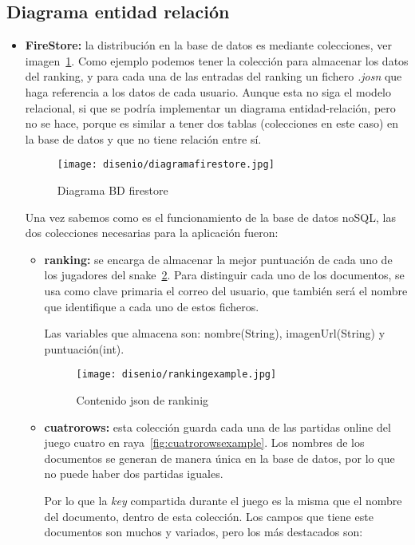 \subsection{Diagrama entidad relación}
\begin{itemize}
	\item \textbf{FireStore:} la distribución en la base de datos es mediante colecciones, ver imagen~\ref{fig:diagramfirestore}. Como ejemplo podemos tener la colección para almacenar los datos del ranking, y para cada una de las entradas del ranking un fichero \emph{.josn} que haga referencia a los datos de cada usuario. Aunque esta no siga el modelo relacional, si que se podría implementar un diagrama entidad-relación, pero no se hace, porque es similar a tener dos tablas (colecciones en este caso) en la base de datos y que no tiene relación entre sí.
	
	\begin{figure}[H]
		\centering
		\texttt{[image: disenio/diagramafirestore.jpg]}
		\caption{Diagrama BD firestore}\label{fig:diagramfirestore}
	\end{figure}

	Una vez sabemos como es el funcionamiento de la base de datos noSQL, las dos colecciones necesarias para la aplicación fueron:
	
	\begin{itemize}
		\item \textbf{ranking:} se encarga de almacenar la mejor puntuación de cada uno de los jugadores del snake~\ref{fig:rankingexample}. Para distinguir cada uno de los documentos, se usa como clave primaria el correo del usuario, que también será el nombre que identifique a cada uno de estos ficheros.
		
		Las variables que almacena son: nombre(String), imagenUrl(String) y puntuación(int). 
		
		\begin{figure}[H]
			\centering
			\texttt{[image: disenio/rankingexample.jpg]}
			\caption{Contenido json de rankinig}\label{fig:rankingexample}
		\end{figure}
	
		\item \textbf{cuatrorows:} esta colección guarda cada una de las partidas online del juego cuatro en raya~\ref{fig:cuatrorowsexample}. Los nombres de los documentos se generan de manera única en la base de datos, por lo que no puede haber dos partidas iguales.
		
		Por lo que la \emph{key} compartida durante el juego es la misma que el nombre del documento, dentro de esta colección. Los campos que tiene este documentos son muchos y variados, pero los más destacados son: 
		

\end{itemize}
\end{itemize}
